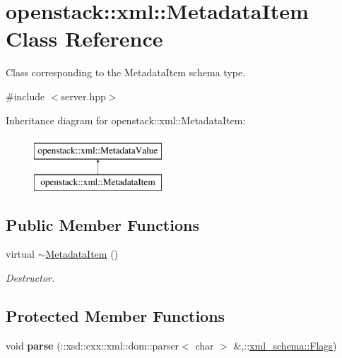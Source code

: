 \hypertarget{classopenstack_1_1xml_1_1MetadataItem}{
\section{openstack::xml::MetadataItem Class Reference}
\label{classopenstack_1_1xml_1_1MetadataItem}
}


Class corresponding to the MetadataItem schema type.  




{\ttfamily \#include $<$server.hpp$>$}

Inheritance diagram for openstack::xml::MetadataItem:\begin{figure}[H]
\begin{center}
\leavevmode
\includegraphics[height=2.000000cm]{classopenstack_1_1xml_1_1MetadataItem}
\end{center}
\end{figure}
\subsection*{Public Member Functions}
\begin{DoxyCompactItemize}
\item 
\hypertarget{classopenstack_1_1xml_1_1MetadataItem_a89c922c62b01866ffa2c583cf57696c4}{
virtual \hyperlink{classopenstack_1_1xml_1_1MetadataItem_a89c922c62b01866ffa2c583cf57696c4}{$\sim$MetadataItem} ()}
\label{classopenstack_1_1xml_1_1MetadataItem_a89c922c62b01866ffa2c583cf57696c4}

\begin{DoxyCompactList}\small\item\em Destructor. \item\end{DoxyCompactList}\end{DoxyCompactItemize}
\subsection*{Protected Member Functions}
\begin{DoxyCompactItemize}
\item 
\hypertarget{classopenstack_1_1xml_1_1MetadataItem_aa13bfb2ecaa7bbc0eacc3847b3410828}{
void {\bfseries parse} (::xsd::cxx::xml::dom::parser$<$ char $>$ \&,::\hyperlink{namespacexml__schema_affb4c227cbd9aa7453dd1dc5a1401943}{xml\_\-schema::Flags})}
\label{classopenstack_1_1xml_1_1MetadataItem_aa13bfb2ecaa7bbc0eacc3847b3410828}

\end{DoxyCompactItemize}
